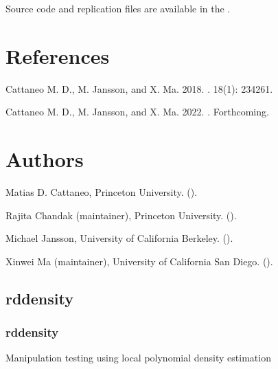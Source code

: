 \documentclass[letterpaper,10pt,english]{sphinxmanual}
\begin{document}
\sphinxAtStartPar
Source code and replication files are available in the .


\chapter{References}
\label{\detokenize{index:references}}
\sphinxAtStartPar
Cattaneo M. D., M. Jansson, and X. Ma. 2018.
.
 18(1): 234\sphinxhyphen{}261.

\sphinxAtStartPar
Cattaneo M. D., M. Jansson, and X. Ma. 2022.
.
 Forthcoming.


\chapter{Authors}
\label{\detokenize{index:authors}}
\sphinxAtStartPar
Matias D. Cattaneo, Princeton University. ().

\sphinxAtStartPar
Rajita Chandak (maintainer), Princeton University. ().

\sphinxAtStartPar
Michael Jansson, University of California Berkeley. ().

\sphinxAtStartPar
Xinwei Ma (maintainer), University of California San Diego. ().

\sphinxstepscope


\section{rddensity}
\label{\detokenize{modules:rddensity}}\label{\detokenize{modules::doc}}
\sphinxstepscope


\subsection{rddensity}
\label{\detokenize{rddensity:rddensity}}\label{\detokenize{rddensity::doc}}
\sphinxAtStartPar
Manipulation testing using local polynomial density estimation
\end{document}
